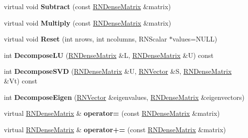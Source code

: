 \begin{DoxyCompactItemize}
\item 
virtual void {\bfseries Subtract} (const \hyperlink{class_r_n_dense_matrix}{R\+N\+Dense\+Matrix} \&matrix)\hypertarget{class_r_n_dense_matrix_af46af9d609bc9e4306f60ab2506841e0}{}\label{class_r_n_dense_matrix_af46af9d609bc9e4306f60ab2506841e0}

\item 
virtual void {\bfseries Multiply} (const \hyperlink{class_r_n_dense_matrix}{R\+N\+Dense\+Matrix} \&matrix)\hypertarget{class_r_n_dense_matrix_a48efac61eb3774d6ad64c7777aa8d034}{}\label{class_r_n_dense_matrix_a48efac61eb3774d6ad64c7777aa8d034}

\item 
virtual void {\bfseries Reset} (int nrows, int ncolumns, R\+N\+Scalar $\ast$values=N\+U\+LL)\hypertarget{class_r_n_dense_matrix_a772d24a2b3ec5afb017d2fbb2395d969}{}\label{class_r_n_dense_matrix_a772d24a2b3ec5afb017d2fbb2395d969}

\item 
int {\bfseries Decompose\+LU} (\hyperlink{class_r_n_dense_matrix}{R\+N\+Dense\+Matrix} \&L, \hyperlink{class_r_n_dense_matrix}{R\+N\+Dense\+Matrix} \&U) const \hypertarget{class_r_n_dense_matrix_afaf61d52f664400494e91efd33dab894}{}\label{class_r_n_dense_matrix_afaf61d52f664400494e91efd33dab894}

\item 
int {\bfseries Decompose\+S\+VD} (\hyperlink{class_r_n_dense_matrix}{R\+N\+Dense\+Matrix} \&U, \hyperlink{class_r_n_vector}{R\+N\+Vector} \&S, \hyperlink{class_r_n_dense_matrix}{R\+N\+Dense\+Matrix} \&Vt) const \hypertarget{class_r_n_dense_matrix_a9a8060fe26380a1ae1d31d91f0560ec6}{}\label{class_r_n_dense_matrix_a9a8060fe26380a1ae1d31d91f0560ec6}

\item 
int {\bfseries Decompose\+Eigen} (\hyperlink{class_r_n_vector}{R\+N\+Vector} \&eigenvalues, \hyperlink{class_r_n_dense_matrix}{R\+N\+Dense\+Matrix} \&eigenvectors)\hypertarget{class_r_n_dense_matrix_adac250a7fea08f6c281000bc6af96429}{}\label{class_r_n_dense_matrix_adac250a7fea08f6c281000bc6af96429}

\item 
virtual \hyperlink{class_r_n_dense_matrix}{R\+N\+Dense\+Matrix} \& {\bfseries operator=} (const \hyperlink{class_r_n_dense_matrix}{R\+N\+Dense\+Matrix} \&matrix)\hypertarget{class_r_n_dense_matrix_a58332e642c10d9e3f58dfa95981325b1}{}\label{class_r_n_dense_matrix_a58332e642c10d9e3f58dfa95981325b1}

\item 
virtual \hyperlink{class_r_n_dense_matrix}{R\+N\+Dense\+Matrix} \& {\bfseries operator+=} (const \hyperlink{class_r_n_dense_matrix}{R\+N\+Dense\+Matrix} \&matrix)\hypertarget{class_r_n_dense_matrix_a2ddd4e9258be3c91c1d9589d535d54bc}{}\label{class_r_n_dense_matrix_a2ddd4e9258be3c91c1d9589d535d54bc}


\end{DoxyCompactItemize}
